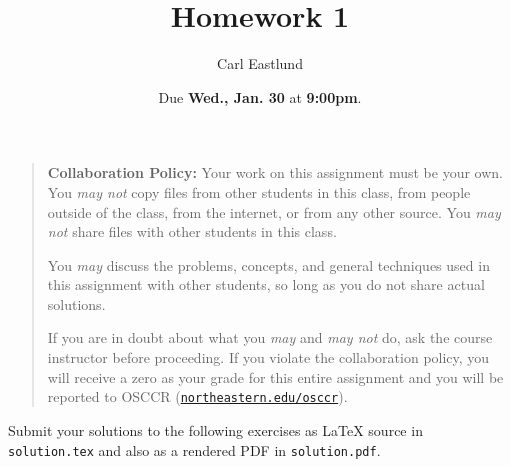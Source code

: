 \documentclass{article}
\title{Homework 1}
\author{Carl Eastlund}
\date{Due \textbf{Wed., Jan. 30} at \textbf{9:00pm}.}
\begin{document}
\maketitle

\newcommand\link[2][http://]{\href{#1#2}{\nolinkurl{#2}}}
\newcommand\http[1]{\link[http://]{#1}}
\newcommand\https[1]{\link[https://]{#1}}
\newcommand\email[1]{\link[mailto:]{#1}}

\begin{quotation}

  \noindent \textbf{Collaboration Policy:} Your work on this assignment must be
  your own.  You \emph{may not} copy files from other students in this class,
  from people outside of the class, from the internet, or from any other source.
  You \emph{may not} share files with other students in this class.

  \medskip

  \noindent You \emph{may} discuss the problems, concepts, and general
  techniques used in this assignment with other students, so long as you do not
  share actual solutions.

  \medskip

  \noindent If you are in doubt about what you \emph{may} and \emph{may not} do,
  ask the course instructor before proceeding.  If you violate the collaboration
  policy, you will receive a zero as your grade for this entire assignment and
  you will be reported to OSCCR (\link{northeastern.edu/osccr}).

\end{quotation}

Submit your solutions to the following exercises as LaTeX source in
\texttt{solution.tex} and also as a rendered PDF in \texttt{solution.pdf}.
\end{document}
